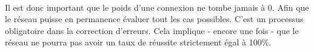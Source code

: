 \documentclass{article}
\begin{document}
  \paragraph{}
    Il est donc important que le poids d'une connexion ne tombe jamais à 0. Afin que le réseau puisse en permanence évaluer tout les cas
    possibles. C'est un processus obligatoire dans la correction d'erreurs. Cela implique - encore une fois - que le réseau ne pourra pas avoir un taux de
    réussite strictement égal à 100\%.
  
\end{document}
